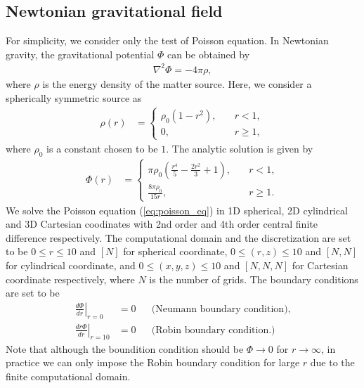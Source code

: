 \subsection{Newtonian gravitational field}
For simplicity, we consider only the test of Poisson equation.
In Newtonian gravity, the gravitational potential $\Phi$ can be obtained by
\begin{align}\label{eq:poisson_eq}
    \nabla^2 \Phi= - 4\pi \rho,
\end{align}
where $\rho$ is the energy density of the matter source.
Here, we consider a spherically symmetric source as
\begin{align}
    \rho(r) &= 
    \begin{cases}
        \rho_0 \left(1-r^2 \right), \quad & r<1,\\
        0, \quad & r\geq 1,
    \end{cases}
\end{align}
where $\rho_0$ is a constant chosen to be $1$.
The analytic solution is given by
\begin{align}
    \Phi(r) &=
    \begin{cases}
        \pi \rho_0 \left(\frac{r^4}{5} - \frac{2 r^2}{3} + 1 \right), \quad & r<1, \\
        \frac{8 \pi \rho_0}{15 r}, \quad & r\geq 1.
    \end{cases}
\end{align}
We solve the Poisson equation (\ref{eq:poisson_eq}) 
in 1D spherical, 2D cylindrical and 3D Cartesian coodinates
with 2nd order and 4th order central finite difference respectively.
The computational domain and the discretization are set to be
$0\leq r \leq 10$ and $[N]$ for spherical coordinate,
$0\leq (r,z) \leq 10$ and $[N,N]$ for cylindrical coordinate, and
$0\leq (x,y,z) \leq 10$ and $[N,N,N]$ for Cartesian coordinate respectively,
where $N$ is the number of grids.
The boundary conditions are set to be
\begin{align}
    \left. \frac{d \Phi}{d r} \right|_{r=0} &= 0 && \text{(Neumann boundary condition)}, \\
    \left. \frac{d r\Phi}{dr} \right|_{r=10} &= 0 && \text{(Robin boundary condition.)}
\end{align}
Note that although the boundition condition should be $\Phi \rightarrow 0$ for $r \rightarrow \infty$,
in practice we can only impose the Robin boundary condition for large $r$ due to the finite computational domain.

